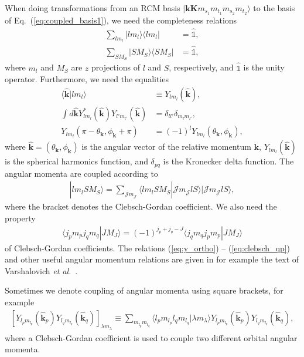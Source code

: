\documentclass[a4paper,12pt]{report}
\begin{document}
 When doing transformations from an RCM basis $|\mathbf{k}\mathbf{K}m_{s_{1}}m_{t_{1}}m_{s_{2}}m_{t_{2}}\rangle $ to the basis of Eq.~(\ref{eq:coupled_basis1}), we need the completeness relations
\begin{align}
  \sum_{lm_{l}}|lm_{l}\rangle \langle lm_{l}| &= \hat{\mathbb{1}}, \label{eq:lm_complete}\\
  \sum_{SM_{S}}|SM_{S}\rangle \langle SM_{S}| &= \hat{\mathbb{1}}, \label{eq:sm_complete}
\end{align}
where $m_{l}$ and $M_{S}$ are $z$ projections of $l$ and $S$, respectively, and $\hat{\mathbb{1}}$ is the unity operator. Furthermore, we need the equalities
\begin{align}
  \langle \mathbf{\hat{k}}|lm_{l}\rangle &\equiv Y_{lm_{l}}(\mathbf{\hat{k}}), \label{eq:Ylm_bracket}\\
  \int d\mathbf{\hat{k}}Y_{lm_{l}}^{*}(\mathbf{\hat{k}})Y_{l'm_{l'}}(\mathbf{\hat{k}}) &= \delta_{ll'}\delta_{m_{l}m_{l'}}, \label{eq:y_ortho} \\
  Y_{lm_{l}}(\pi - \theta_{\mathbf{k}}, \phi_{\mathbf{k}} + \pi ) &= (-1)^{l}Y_{lm_{l}}(\theta_{\mathbf{k}}, \phi_{\mathbf{k}}), \label{eq:y_minus}
\end{align}
where $\mathbf{\hat{k}} = (\theta_{\mathbf{k}}, \phi_{\mathbf{k}})$ is the angular vector of the relative momentum $\mathbf{k}$, $Y_{lm_{l}}(\mathbf{\hat{k}})$ is the spherical harmonics function, and $\delta_{pq}$ is the Kronecker delta function. The angular momenta are coupled according to
\begin{align}
  |lm_{l}SM_{S}\rangle = \sum_{\mathcal{J}m_{\mathcal{J}}}\langle lm_{l}SM_{S}|\mathcal{J}m_{\mathcal{J}}lS\rangle |\mathcal{J}m_{\mathcal{J}}lS\rangle , \label{eq:ls_jm}
\end{align}
where the bracket denotes the Clebsch-Gordan coefficient. We also need the property 
\begin{align}
  \langle j_{p}m_{p}j_{q}m_{q}|JM_{J}\rangle = (-1)^{j_{p}+j_{q}-J}\langle j_{q}m_{q}j_{p}m_{p}|JM_{J}\rangle 
  \label{eq:clebsch_qp}
\end{align}
of Clebsch-Gordan coefficients.
The relations (\ref{eq:y_ortho}) -- (\ref{eq:clebsch_qp}) and other useful angular momentum relations are given in for example the text of Varshalovich \emph{et al.}~\cite{varshalovich}.

Sometimes we denote coupling of angular momenta using
square brackets, for example
\begin{align} \label{eq:coupling_squarebr}
  \left[ Y_{l_{p}m_{l_{p}}}(\mathbf{\hat{k}}_{p}) 
    Y_{l_{q}m_{l_{q}}}(\mathbf{\hat{k}}_{q}) \right]_{\lambda m_{\lambda } } \equiv 
  \sum_{m_{l_{p}}m_{l_{q}}} \langle l_{p}m_{l_{p}}l_{q}m_{l_{q}}|\lambda m_{\lambda} \rangle
  Y_{l_{p}m_{l_{p}}}(\mathbf{\hat{k}}_{p})Y_{l_{q}m_{l_{q}}}(\mathbf{\hat{k}}_{q}),
\end{align}
where a Clebsch-Gordan coefficient is used to couple two 
different orbital angular momenta.
\end{document}
